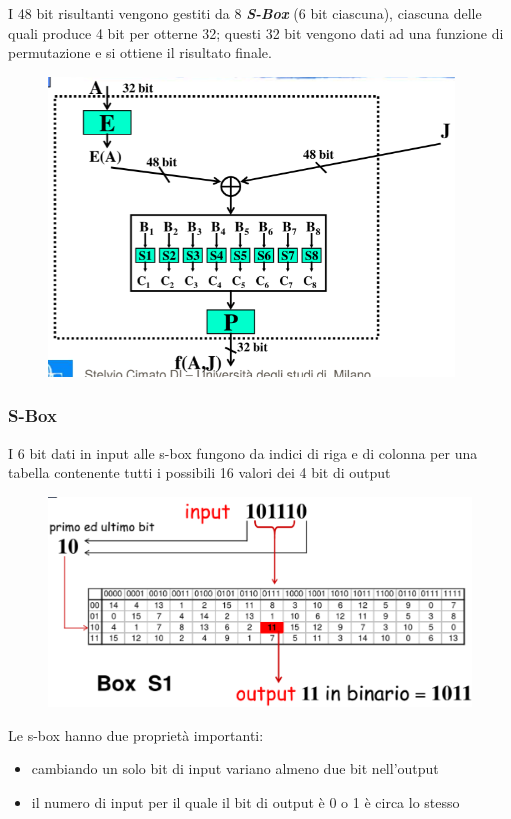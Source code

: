 \noindent I 48 bit risultanti vengono gestiti da 8 \textbf{\textit{S-Box}} (6 bit ciascuna), ciascuna delle quali produce 
4 bit per otterne 32; questi 32 bit vengono dati ad una funzione di permutazione e si ottiene il risultato finale.

\begin{figure}[H]
    \centering
    \includegraphics[width=0.7\linewidth]{chapters/chap03/images/f.png}
\end{figure}

\subsubsection{S-Box}

I 6 bit dati in input alle s-box fungono da indici di riga e di colonna per una tabella 
contenente tutti i possibili 16 valori dei 4 bit di output 

\begin{figure}[H]
    \centering
    \includegraphics[width=0.7\linewidth]{chapters/chap03/images/s-box.png}
\end{figure}

\noindent Le s-box hanno due proprietà importanti:
\begin{itemize}
    \item cambiando un solo bit di input variano almeno due bit nell'output 
    \item il numero di input per il quale il bit di output è 0 o 1 è circa lo stesso
\end{itemize}


